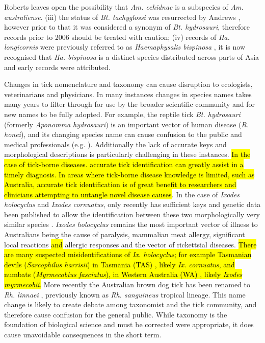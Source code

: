 \documentclass[a4paper, nobind]{templates/ociamthesis}
\begin{document}
Roberts \autocite*{robertsAustralianTicks1970} leaves open the possibility that \emph{Am. echidnae} is a subspecies of \emph{Am. australiense}.
(iii) the status of \emph{Bt. tachyglossi} was resurrected by Andrews \autocite*{andrewsSystematicStatusAponomma2006}, however prior to that it was considered a synonym of \emph{Bt. hydrosauri}, therefore records prior to 2006 should be treated with caution;
(iv) records of \emph{Ha. longicornis} were previously referred to as \emph{Haemaphysalis bispinosa} \autocite{robertsSystematicStudyAustralian1963}, it is now recognised that \emph{Ha. bispinosa} is a distinct species distributed across parts of Asia and early records were attributed.

Changes in tick nomenclature and taxonomy can cause disruption to ecologists, veterinarians and physicians.
In many instances changes in species names takes many years to filter through for use by the broader scientific community and for new names to be fully adopted.
For example, the reptile tick \emph{Bt. hydrosauri} (formerly \emph{Aponomma hydrosauri}) is an important vector of human disease (\emph{R. honei}), and its changing species name can cause confusion to the public and medical professionals (e.g. \textcite{stenosAponommaHydrosauriReptileassociated2003}).
Additionally the lack of accurate keys and morphological descriptions is particularly challenging in these instances.
\hl{In the case of tick-borne diseases. accurate tick identification can greatly assist in a timely diagnosis. In areas where tick-borne disease knowledge is limited, such as Australia, accurate tick identification is of great benefit to researchers and clinicians attempting to untangle novel disease causes}.
In the case of \emph{Ixodes holocyclus} and \emph{Ixodes cornuatus}, only recently has sufficient keys and genetic data been published to allow the identification between these two morphologically very similar species \autocite{songPhylogeneticPhylogeographicRelationships2011,barkerTicksAustraliaSpecies2014,kwakKeysMorphologicalIdentification2017}.
\emph{Ixodes holocyclus} remains the most important vector of illness to Australians being the cause of paralysis, mammalian meat allergy, significant local reactions \hl{and} allergic responses and the vector of rickettsial diseases.
\hl{There are many suspected misidentifications of \emph{Ix. holocyclus}; for example Tasmanian devils (\emph{Sarcophilus harrisii}) in Tasmania (TAS) \autocite{vilcinsDetectionHepatozoonSpotted2009}, likely \emph{Ix. cornuatus}, and numbats (\emph{Myrmecobius fasciatus}), in Western Australia (WA) \autocite{calabyObservationsBandedAnteater1960}, likely \emph{Ixodes myrmecobii}.}
More recently the Australian brown dog tick has been renamed to \emph{Rh. linnaei} \autocite{slapetaTropicalLineageBrown2021}, previously known as \emph{Rh. sanguineus} tropical lineage.
This name change is likely to create debate among taxonomist and the tick community, and therefore cause confusion for the general public.
While taxonomy is the foundation of biological science and must be corrected were appropriate, it does cause unavoidable consequences in the short term.
\end{document}
